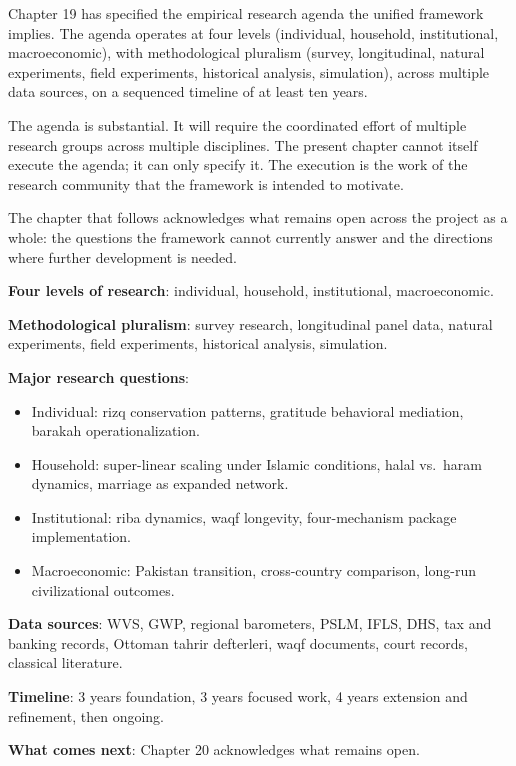 Chapter 19 has specified the empirical research agenda the
unified framework implies. The agenda operates at four levels
(individual, household, institutional, macroeconomic), with
methodological pluralism (survey, longitudinal, natural
experiments, field experiments, historical analysis, simulation),
across multiple data sources, on a sequenced timeline of at least
ten years.

The agenda is substantial. It will require the coordinated effort
of multiple research groups across multiple disciplines. The
present chapter cannot itself execute the agenda; it can only
specify it. The execution is the work of the research community
that the framework is intended to motivate.

The chapter that follows acknowledges what remains open across
the project as a whole: the questions the framework cannot
currently answer and the directions where further development is
needed.

\begin{summarybox}
\textbf{Four levels of research}: individual, household,
institutional, macroeconomic.

\textbf{Methodological pluralism}: survey research, longitudinal
panel data, natural experiments, field experiments, historical
analysis, simulation.

\textbf{Major research questions}:
\begin{itemize}[leftmargin=1.5em]
    \item Individual: rizq conservation patterns, gratitude
    behavioral mediation, barakah operationalization.
    \item Household: super-linear scaling under Islamic
    conditions, halal vs.\ haram dynamics, marriage as expanded
    network.
    \item Institutional: riba dynamics, waqf longevity,
    four-mechanism package implementation.
    \item Macroeconomic: Pakistan transition, cross-country
    comparison, long-run civilizational outcomes.
\end{itemize}

\textbf{Data sources}: WVS, GWP, regional barometers, PSLM,
IFLS, DHS, tax and banking records, Ottoman tahrir defterleri,
waqf documents, court records, classical literature.

\textbf{Timeline}: 3 years foundation, 3 years focused work,
4 years extension and refinement, then ongoing.

\textbf{What comes next}: Chapter 20 acknowledges what remains
open.
\end{summarybox}

\cleardoublepage
